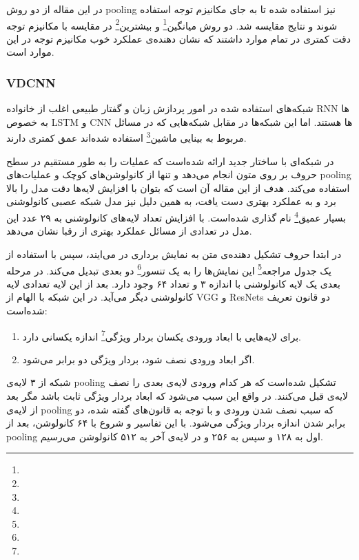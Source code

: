 \documentclass[12pt, a4paper, oneside]{report}
\begin{document}
در این مقاله از دو روش
pooling
نیز استفاده شده تا به جای مکانیزم توجه استفاده شوند و نتایج مقایسه شد. 
دو روش
میانگین\footnote{}
و
بیشترین\footnote{}
در مقایسه با مکانیزم توجه دقت کمتری در تمام موارد داشتند که نشان دهنده‌ی عملکرد خوب مکانیزم توجه در این موارد است.

\subsubsection{VDCNN}

شبکه‌های استفاده شده در امور پردازش زبان و گفتار طبیعی اغلب از خانواده
RNN
ها به خصوص
LSTM
و
CNN
ها هستند. اما این شبکه‌ها در مقابل شبکه‌هایی که در مسائل مربوط به 
بینایی ماشین\footnote{}
استفاده شده‌اند عمق کمتری دارند.

در
\cite{conneau2016very}
شبکه‌ای با ساختار جدید ارائه شده‌است که عملیات را به طور مستقیم در سطح حروف بر روی متون انجام می‌دهد
و تنها از کانولوشن‌های کوچک و عملیات‌های
pooling
استفاده می‌کند. هدف از این مقاله آن است که بتوان با افزایش لایه‌ها دقت مدل را بالا برد و به عملکرد بهتری
دست یافت، به همین دلیل نیز مدل
شبکه عصبی کانولوشنی بسیار عمیق\footnote{}
نام گذاری شده‌است.
با افزایش تعداد لایه‌های کانولوشنی به ۲۹ عدد این مدل در تعدادی از مسائل عملکرد بهتری از
رقبا نشان می‌دهد.

در ابتدا حروف تشکیل دهنده‌ی متن به نمایش برداری در می‌ایند، سپس با استفاده از یک
جدول مراجعه\footnote{}
این نمایش‌ها را به یک
تنسور\footnote{}
دو بعدی تبدیل می‌کند. در مرحله بعدی یک لایه کانولوشنی با اندازه ۳ و تعداد ۶۴ وجود دارد. بعد از این
لایه تعدادی لایه کانولوشنی دیگر می‌آید. در این شبکه با الهام از
VGG
و
ResNets
دو قانون تعریف شده‌است:

\begin{enumerate}
    \item برای لایه‌هایی با ابعاد ورودی یکسان بردار ویژگی\footnote{} اندازه یکسانی دارد.
    \item اگر ابعاد ورودی نصف شود، بردار ویژگی دو برابر می‌شود.
\end{enumerate}

شبکه از ۳ لایه‌ی
pooling
تشکیل شده‌است که هر کدام ورودی لایه‌ی بعدی را نصف لایه‌ی قبل می‌کنند. در واقع این سبب می‌شود که ابعاد
بردار ویژگی ثابت باشد مگر بعد از لایه‌ی
pooling
که سبب نصف شدن ورودی و با توجه به قانون‌های گفته شده، دو برابر شدن اندازه بردار ویژگی می‌شود.
با این تفاسیر و شروع با ۶۴ کانولوشن، بعد از
pooling
اول به ۱۲۸ و سپس به ۲۵۶ و در لایه‌ی آخر به ۵۱۲ کانولوشن می‌رسیم.
\end{document}

